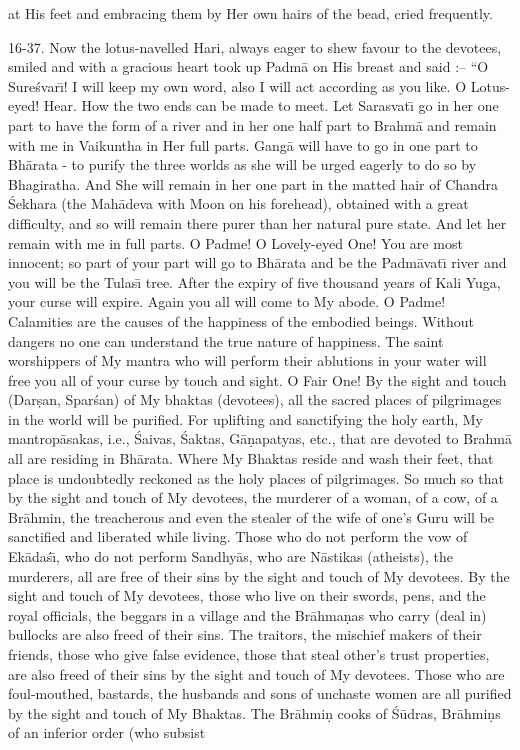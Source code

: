 at His feet and embracing them by Her own hairs of the bead, cried frequently.

16-37. Now the lotus-navelled Hari, always eager to shew favour to the devotees, smiled and with a gracious heart took up Padm\=a on His breast and said :-- ``O Sure\'svar\={\i}! I will keep my own word, also I will act according as you like. O Lotus-eyed! Hear. How the two ends can be made to meet. Let Sarasvat\={\i} go in her one part to have the form of a river and in her one half part to Brahm\=a and remain with me in Vaikuntha in Her full parts. Gang\=a will have to go in one part to Bh\=arata - to purify the three worlds as she will be urged eagerly to do so by Bhagiratha. And She will remain in her one part in the matted hair of Chandra \'Sekhara (the Mah\=adeva with Moon on his forehead), obtained with a great difficulty, and so will remain there purer than her natural pure state. And let her remain with me in full parts. O Padme! O Lovely-eyed One! You are most innocent; so part of your part will go to Bh\=arata and be the Padm\=avat\={\i} river and you will be the Tulas\={\i} tree. After the expiry of five thousand years of Kali Yuga, your curse will expire. Again you all will come to My abode. O Padme! Calamities are the causes of the happiness of the embodied beings. Without dangers no one can understand the true nature of happiness. The saint worshippers of My mantra who will perform their ablutions in your water will free you all of your curse by touch and sight. O Fair One! By the sight and touch (Dar\d{s}an, Spar\'san) of My bhaktas (devotees), all the sacred places of pilgrimages in the world will be purified. For uplifting and sanctifying the holy earth, My mantrop\=asakas, i.e., \'Saivas, \'Saktas, G\=a\d{n}apatyas, etc., that are devoted to Brahm\=a all are residing in Bh\=arata. Where My Bhaktas reside and wash their feet, that place is undoubtedly reckoned as the holy places of pilgrimages. So much so that by the sight and touch of My devotees, the murderer of a woman, of a cow, of a Br\=ahmin, the treacherous and even the stealer of the wife of one's Guru will be sanctified and liberated while living. Those who do not perform the vow of Ek\=ada\'s\={\i}, who do not perform Sandhy\=as, who are N\=astikas (atheists), the murderers, all are free of their sins by the sight and touch of My devotees. By the sight and touch of My devotees, those who live on their swords, pens, and the royal officials, the beggars in a village and the Br\=ahma\d{n}as who carry (deal in) bullocks are also freed of their sins. The traitors, the mischief makers of their friends, those who give false evidence, those that steal other's trust properties, are also freed of their sins by the sight and touch of My devotees. Those who are foul-mouthed, bastards, the husbands and sons of unchaste women are all purified by the sight and touch of My Bhaktas. The Br\=ahmi\d{n} cooks of \'S\=udras, Br\=ahmi\d{n}s of an inferior order (who subsist

